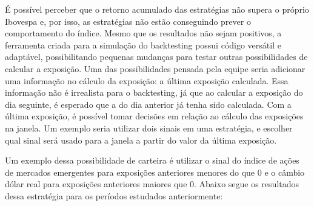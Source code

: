 É possível perceber que o retorno acumulado das estratégias não supera o próprio Ibovespa e, por isso, as estratégias não estão conseguindo prever o comportamento do índice. Mesmo que os resultados não sejam positivos, a ferramenta criada para a simulação do backtesting possui código versátil e adaptável, possibilitando pequenas mudanças para testar outras possibilidades de calcular a exposição. 
Uma das possibilidades pensada pela equipe seria adicionar uma informação no cálculo da exposição: a última exposição calculada. Essa informação não é irrealista para o backtesting, já que ao calcular a exposição do dia seguinte, é esperado que a do dia anterior já tenha sido calculada. Com a última exposição, é possível tomar decisões em relação ao cálculo das exposições na janela. Um exemplo seria utilizar dois sinais em uma estratégia, e escolher qual sinal será usado para a janela a partir do valor da última exposição. 

Um exemplo dessa possibilidade de carteira é utilizar o sinal do índice de ações de mercados emergentes para exposições anteriores menores do que 0 e o câmbio dólar real para exposições anteriores maiores que 0. Abaixo segue os resultados dessa estratégia para os períodos estudados anteriormente:

